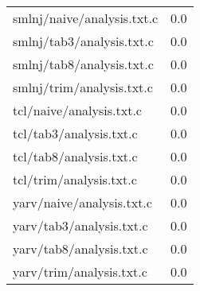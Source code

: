\begin{longtable}{l r}
{smlnj/naive/analysis.txt.c} & 0.0  \\
{smlnj/tab3/analysis.txt.c} & 0.0  \\
{smlnj/tab8/analysis.txt.c} & 0.0  \\
{smlnj/trim/analysis.txt.c} & 0.0  \\
{tcl/naive/analysis.txt.c} & 0.0  \\
{tcl/tab3/analysis.txt.c} & 0.0  \\
{tcl/tab8/analysis.txt.c} & 0.0  \\
{tcl/trim/analysis.txt.c} & 0.0  \\
{yarv/naive/analysis.txt.c} & 0.0  \\
{yarv/tab3/analysis.txt.c} & 0.0  \\
{yarv/tab8/analysis.txt.c} & 0.0  \\
{yarv/trim/analysis.txt.c} & 0.0  \\
\end{longtable}
